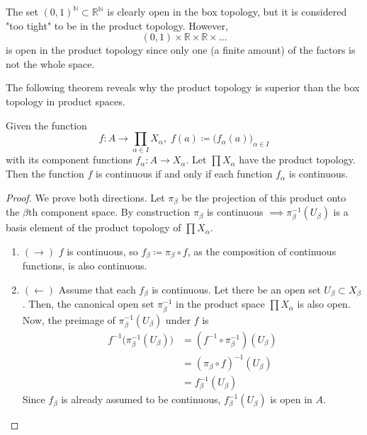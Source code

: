   \begin{example}
    The set $(0,1)^\mathbb{N} \subset \mathbb{R}^\mathbb{N}$ is clearly open in the box topology, but it is considered "too tight" to be in the product topology. However, 
    \begin{equation}
      (0,1) \times \mathbb{R} \times \mathbb{R} \times \ldots
    \end{equation}
    is open in the product topology since only one (a finite amount) of the factors is not the whole space. 
  \end{example}

  The following theorem reveals why the product topology is superior than the box topology in product spaces. 

  \begin{theorem}
    Given the function 
    \begin{equation}
      f: A \rightarrow \prod_{\alpha \in I} X_\alpha, \; f(a) \coloneqq \big( f_\alpha (a) \big)_{\alpha \in I}
    \end{equation}
    with its component functions $f_\alpha: A \rightarrow X_\alpha$. Let $\prod X_\alpha$ have the product topology. Then the function $f$ is continuous if and only if each function $f_\alpha$ is continuous. 
  \end{theorem}
  \begin{proof}
    We prove both directions. Let $\pi_\beta$ be the projection of this product onto the $\beta$th component space. By construction $\pi_\beta$ is continuous $\implies \pi_\beta^{-1} (U_\beta)$ is a basis element of the product topology of $\prod X_\alpha$. 
    \begin{enumerate}
      \item $(\rightarrow)$ $f$ is continuous, so $f_\beta \coloneqq \pi_\beta \circ f$, as the composition of continuous functions, is also continuous. 
      \item $(\leftarrow)$ Assume that each $f_\beta$ is continuous. Let there be an open set $U_\beta \subset X_\beta$. Then, the canonical open set $\pi_\beta^{-1}$ in the product space $\prod X_\alpha$ is also open. Now, the preimage of $\pi_\beta^{-1} (U_\beta)$ under $f$ is 
      \begin{align*}
        f^{-1} \big( \pi_\beta^{-1} (U_\beta)\big) & = (f^{-1} \circ \pi_\beta^{-1})(U_\beta) \\
        & = (\pi_\beta \circ f)^{-1} (U_\beta) \\
        & = f_\beta^{-1} (U_\beta)
      \end{align*}
      Since $f_\beta$ is already assumed to be continuous, $f_\beta^{-1} (U_\beta)$ is open in $A$. 
    \end{enumerate}
  \end{proof} 

